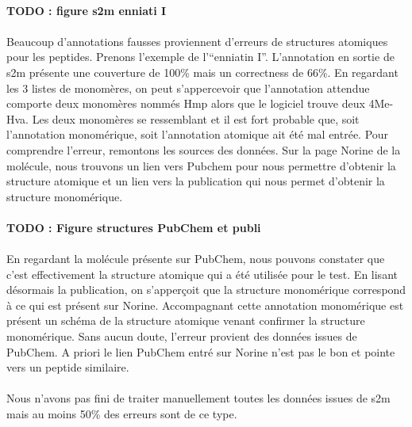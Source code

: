 \documentclass[12pt,french,twoside]{report}
\begin{document}
\paragraph{TODO : figure s2m enniati I}

\paragraph{}Beaucoup d'annotations fausses proviennent d'erreurs de structures atomiques pour les peptides.
Prenons l'exemple de l'``enniatin I''.
L'annotation en sortie de s2m présente une couverture de 100\% mais un correctness de 66\%.
En regardant les 3 listes de monomères, on peut s'appercevoir que l'annotation attendue comporte deux monomères nommés Hmp alors que le logiciel trouve deux 4Me-Hva.
Les deux monomères se ressemblant et il est fort probable que, soit l'annotation monomérique, soit l'annotation atomique ait été mal entrée.
Pour comprendre l'erreur, remontons les sources des données.
Sur la page Norine de la molécule, nous trouvons un lien vers Pubchem pour nous permettre d'obtenir la structure atomique et un lien vers la publication qui nous permet d'obtenir la structure monomérique.

\paragraph{TODO : Figure structures PubChem et publi}

\paragraph{}En regardant la molécule présente sur PubChem, nous pouvons constater que c'est effectivement la structure atomique qui a été utilisée pour le test.
En lisant désormais la publication, on s'apperçoit que la structure monomérique correspond à ce qui est présent sur Norine.
Accompagnant cette annotation monomérique est présent un schéma de la structure atomique venant confirmer la structure monomérique.
Sans aucun doute, l'erreur provient des données issues de PubChem.
A priori le lien PubChem entré sur Norine n'est pas le bon et pointe vers un peptide similaire.

\paragraph{}Nous n'avons pas fini de traiter manuellement toutes les données issues de s2m mais au moins 50\% des erreurs sont de ce type.
\end{document}
